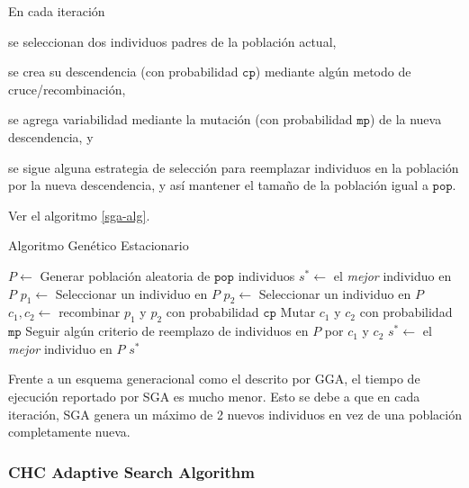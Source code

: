 En cada iteración
\begin{inparaenum}
\item se seleccionan dos individuos padres de la población actual,
\item se crea su descendencia (con probabilidad $\texttt{cp}$) mediante algún metodo de cruce/recombinación,
\item se agrega variabilidad mediante la mutación (con probabilidad $\texttt{mp}$) de la nueva descendencia, y
\item se sigue alguna estrategia de selección para reemplazar individuos en la población por la nueva descendencia, y así mantener el tamaño de la población igual a $\texttt{pop}$.
\end{inparaenum}
Ver el algoritmo \ref{sga-alg}.

\begin{algorithm}
\caption{Algoritmo Genético Estacionario}
\label{sga-alg}
\begin{algorithmic}[1]


\State $P \gets$ Generar población aleatoria de $\texttt{pop}$ individuos
\State $s^* \gets $ el \emph{mejor} individuo en $P$
	\State $p_1 \gets$ Seleccionar un individuo en $P$
	\State $p_2 \gets$ Seleccionar un individuo en $P$
	\State $c_1, c_2 \gets $ recombinar $p_1$ y $p_2$ con probabilidad $\texttt{cp}$
	\State Mutar $c_1$ y $c_2$ con probabilidad $\texttt{mp}$
	\State Seguir algún criterio de reemplazo de individuos en $P$ por $c_1$ y $c_2$
		\State $s^* \gets$ el \emph{mejor} individuo en $P$
	\EndIf
\EndWhile
\State \Return $s^*$

\end{algorithmic}
\end{algorithm}

Frente a un esquema generacional como el descrito por GGA, el tiempo de ejecución reportado por SGA es mucho menor. Esto se debe a que en cada iteración, SGA genera un máximo de 2 nuevos individuos en vez de una población completamente nueva.

\subsubsection{CHC Adaptive Search Algorithm}

